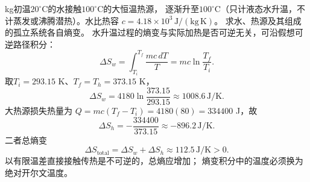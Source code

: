  kg初温$20^\circ$C的水接触$100^\circ$C的大恒温热源，
逐渐升至$100^\circ$C（只计液态水升温，不计蒸发或沸腾潜热）。水比热容
$c=4.18\times10^3\,\mathrm{J/(kg\,K)}$。
求水、热源及其组成的孤立系统各自熵变。
\workings
水升温过程的熵变与实际加热是否可逆无关，可沿假想可逆路径积分：
\[
\Delta S_w=\int_{T_i}^{T_f}\frac{mc\,dT}{T}
=mc\ln\frac{T_f}{T_i}.
\]
取$T_i=293.15$ K、$T_f=T_h=373.15$ K，
\[
\boxed{\Delta S_w
=4180\ln\frac{373.15}{293.15}
\approx1008.6\,\mathrm{J/K}}.
\]
大热源损失热量为
$Q=mc(T_f-T_i)=4180(80)=334400$ J，故
\[
\boxed{\Delta S_h=-\frac{334400}{373.15}
\approx-896.2\,\mathrm{J/K}}.
\]
二者总熵变
\[
\boxed{\Delta S_{\mathrm{total}}
=\Delta S_w+\Delta S_h
\approx112.5\,\mathrm{J/K}>0}.
\]
\crosscheck 以有限温差直接接触传热是不可逆的，总熵应增加；
熵变积分中的温度必须换为绝对开尔文温度。
